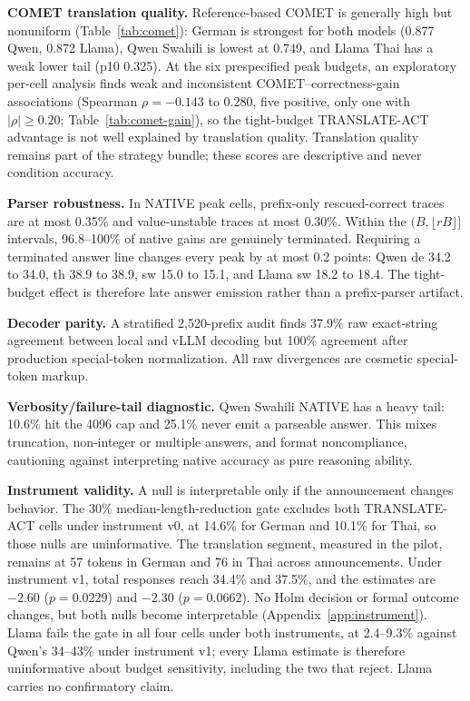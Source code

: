 \documentclass[11pt]{article}
\begin{document}
\textbf{COMET translation quality.} Reference-based COMET is generally high but nonuniform (Table~\ref{tab:comet}): German is strongest for both models (0.877 Qwen, 0.872 Llama), Qwen Swahili is lowest at 0.749, and Llama Thai has a weak lower tail (p10 0.325). At the six prespecified peak budgets, an exploratory per-cell analysis finds weak and inconsistent COMET--correctness-gain associations (Spearman \(\rho=-0.143\) to \(0.280\), five positive, only one with \(|\rho|\ge0.20\); Table~\ref{tab:comet-gain}), so the tight-budget TRANSLATE-ACT advantage is not well explained by translation quality. Translation quality remains part of the strategy bundle; these scores are descriptive and never condition accuracy.

\textbf{Parser robustness.} In NATIVE peak cells, prefix-only rescued-correct traces are at most 0.35\% and value-unstable traces at most 0.30\%. Within the \((B,\lfloor rB\rfloor]\) intervals, 96.8--100\% of native gains are genuinely terminated. Requiring a terminated answer line changes every peak by at most 0.2 points: Qwen de 34.2 to 34.0, th 38.9 to 38.9, sw 15.0 to 15.1, and Llama sw 18.2 to 18.4. The tight-budget effect is therefore late answer emission rather than a prefix-parser artifact.

\textbf{Decoder parity.} A stratified 2,520-prefix audit finds 37.9\% raw exact-string agreement between local and vLLM decoding but 100\% agreement after production special-token normalization. All raw divergences are cosmetic special-token markup.

\textbf{Verbosity/failure-tail diagnostic.} Qwen Swahili NATIVE has a heavy tail: 10.6\% hit the 4096 cap and 25.1\% never emit a parseable answer. This mixes truncation, non-integer or multiple answers, and format noncompliance, cautioning against interpreting native accuracy as pure reasoning ability.

\textbf{Instrument validity.} A null is interpretable only if the announcement changes behavior. The 30\% median-length-reduction gate excludes both TRANSLATE-ACT cells under instrument v0, at 14.6\% for German and 10.1\% for Thai, so those nulls are uninformative. The translation segment, measured in the pilot, remains at 57 tokens in German and 76 in Thai across announcements. Under instrument v1, total responses reach 34.4\% and 37.5\%, and the estimates are \(-2.60\) (\(p=0.0229\)) and \(-2.30\) (\(p=0.0662\)). No Holm decision or formal outcome changes, but both nulls become interpretable (Appendix~\ref{app:instrument}). Llama fails the gate in all four cells under both instruments, at 2.4--9.3\% against Qwen's 34--43\% under instrument v1; every Llama estimate is therefore uninformative about budget sensitivity, including the two that reject. Llama carries no confirmatory claim.
\end{document}
